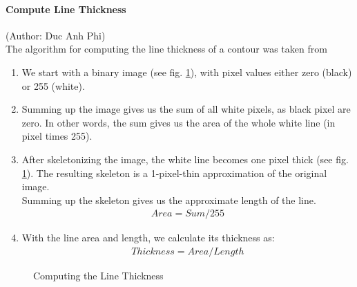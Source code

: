 \documentclass[12pt]{article}
\begin{document}
	\paragraph{Compute Line Thickness}
	\small{(Author: Duc Anh Phi)}\\
	The algorithm for computing the line thickness of a contour was taken from \cite{stackexchange}
	\begin{enumerate}
		\item We start with a binary image (see fig. \ref{fig:linethickness}), with pixel values either zero (black) or 255 (white).
		\item Summing up the image gives us the sum of all white pixels, as black pixel are zero. In other words, the sum gives us the area of the whole white line (in pixel times 255).
		\item After skeletonizing the image, the white line becomes one pixel thick (see fig. \ref{fig:linethickness}). The resulting skeleton is a 1-pixel-thin approximation of the original image.\\
		Summing up the skeleton gives us the approximate length of the line.
		\begin{align}
		Area = Sum/255
		\end{align}
		\item With the line area and length, we calculate its thickness as:
		\begin{align}
		Thickness = Area / Length
		\end{align}
	\end{enumerate}

	\begin{figure}[h!]
		\centering
		\quad
		
		\caption{Computing the Line Thickness}
		\label{fig:linethickness}
	\end{figure}
	
\end{document}
